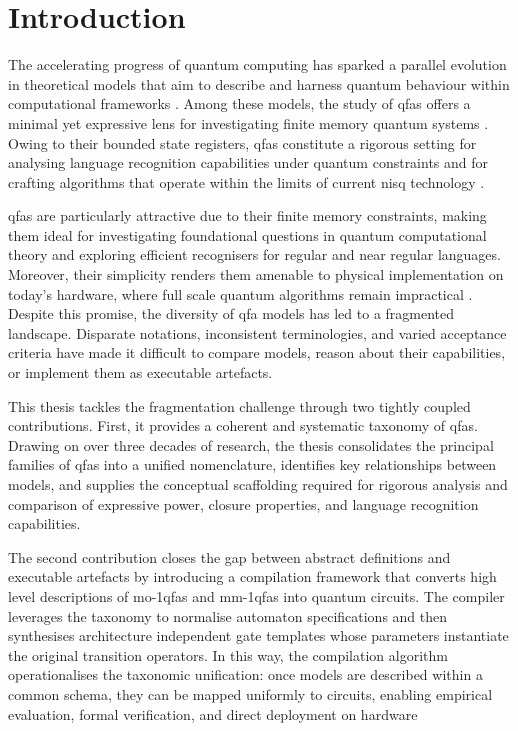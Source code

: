 \chapter{Introduction}
\label{chap:introduction}

The accelerating progress of quantum computing has sparked a parallel evolution in theoretical models that aim to describe and harness quantum behaviour within computational frameworks \cite{deutsch1985quantum}. Among these models, the study of \glspl{qfa} offers a minimal yet expressive lens for investigating finite memory quantum systems \cite{ambainis19981,moore2000quantum}. Owing to their bounded state registers, \glspl{qfa} constitute a rigorous setting for analysing language recognition capabilities under quantum constraints and for crafting algorithms that operate within the limits of current \gls{nisq} technology \cite{Preskill2018nisq,lussi2024implementing}.

\Glspl{qfa} are particularly attractive due to their finite memory constraints, making them ideal for investigating foundational questions in quantum computational theory and exploring efficient recognisers for regular and near regular languages. Moreover, their simplicity renders them amenable to physical implementation on today's hardware, where full scale quantum algorithms remain impractical \cite{Arute2019supremacy}. Despite this promise, the diversity of \gls{qfa} models has led to a fragmented landscape. Disparate notations, inconsistent terminologies, and varied acceptance criteria have made it difficult to compare models, reason about their capabilities, or implement them as executable artefacts.

This thesis tackles the fragmentation challenge through two tightly coupled contributions. First, it provides a coherent and systematic taxonomy of \glspl{qfa}. Drawing on over three decades of research, the thesis consolidates the principal families of \glspl{qfa} into a unified nomenclature, identifies key relationships between models, and supplies the conceptual scaffolding required for rigorous analysis and comparison of expressive power, closure properties, and language recognition capabilities.

The second contribution closes the gap between abstract definitions and executable artefacts by introducing a compilation framework that converts high level descriptions of \glspl{mo-1qfa} and \glspl{mm-1qfa} into quantum circuits. The compiler leverages the taxonomy to normalise automaton specifications and then synthesises architecture independent gate templates whose parameters instantiate the original transition operators. In this way, the compilation algorithm operationalises the taxonomic unification: once models are described within a common schema, they can be mapped uniformly to circuits, enabling empirical evaluation, formal verification, and direct deployment on hardware

